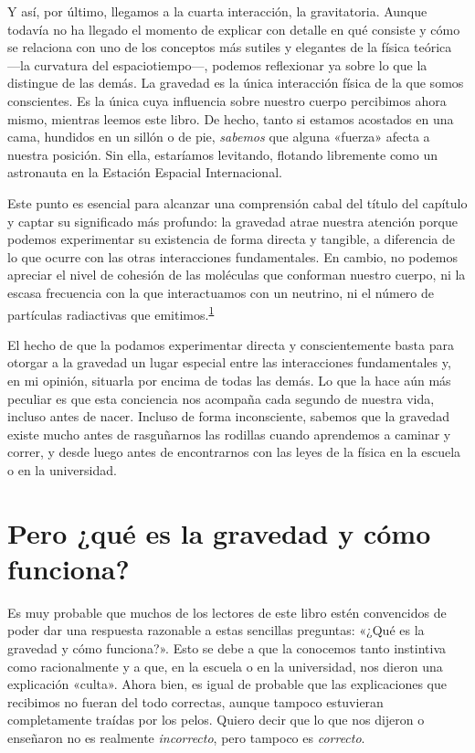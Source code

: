Y así, por último, llegamos a la cuarta interacción, la gravitatoria. Aunque todavía
no ha llegado el momento de explicar con detalle en qué consiste y cómo se relaciona
con uno de los conceptos más sutiles y elegantes de la física teórica ---la curvatura
del espaciotiempo---, podemos reflexionar ya sobre lo que la distingue de las demás.
La gravedad es la única interacción física de la que somos conscientes. Es la única
cuya influencia sobre nuestro cuerpo percibimos ahora mismo, mientras leemos este
libro. De hecho, tanto si estamos acostados en una cama, hundidos en un sillón o de
pie, \emph{sabemos} que alguna «fuerza» afecta a nuestra posición. Sin ella, estaríamos
levitando, flotando libremente como un astronauta en la Estación Espacial Internacional.

Este punto es esencial para alcanzar una comprensión cabal del título del capítulo
y captar su significado más profundo: la gravedad atrae nuestra atención porque
podemos experimentar su existencia de forma directa y tangible, a diferencia de lo
que ocurre con las otras interacciones fundamentales. En cambio, no podemos apreciar
el nivel de cohesión de las moléculas que conforman nuestro cuerpo, ni la escasa
frecuencia con la que interactuamos con un neutrino, ni el número de partículas
radiactivas que emitimos.\textsuperscript{\hyperlink{note:01-01}{1}}

El hecho de que la podamos experimentar directa y conscientemente basta para otorgar
a la gravedad un lugar especial entre las interacciones fundamentales y, en mi
opinión, situarla por encima de todas las demás. Lo que la hace aún más peculiar
es que esta conciencia nos acompaña cada segundo de nuestra vida, incluso antes
de nacer. Incluso de forma inconsciente, sabemos que la gravedad existe mucho antes
de rasguñarnos las rodillas cuando aprendemos a caminar y correr, y desde luego
antes de encontrarnos con las leyes de la física en la escuela o en la universidad.

\section{Pero ¿qué es la gravedad y cómo funciona?}\label{sec:01-gravity}

Es muy probable que muchos de los lectores de este libro estén convencidos de poder
dar una respuesta razonable a estas sencillas preguntas: «¿Qué es la gravedad y cómo
funciona?». Esto se debe a que la conocemos tanto instintiva como racionalmente y a
que, en la escuela o en la universidad, nos dieron una explicación «culta». Ahora
bien, es igual de probable que las explicaciones que recibimos no fueran del todo
correctas, aunque tampoco estuvieran completamente traídas por los pelos. Quiero
decir que lo que nos dijeron o enseñaron no es realmente \emph{incorrecto}, pero
tampoco es \emph{correcto}.

